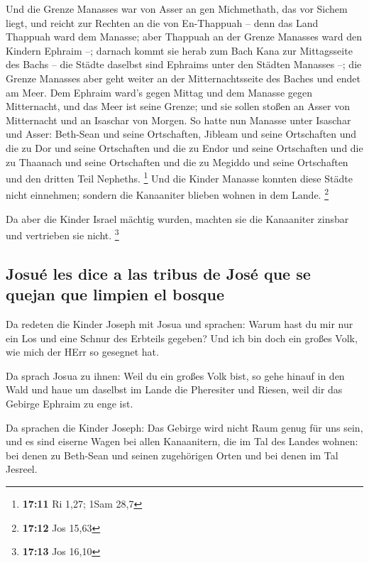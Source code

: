  Und die Grenze Manasses war von Asser an gen Michmethath,
das vor Sichem liegt, und reicht zur Rechten an die von En-Thappuah --
 denn das Land Thappuah ward dem Manasse; aber Thappuah an
der Grenze Manasses ward den Kindern Ephraim --;  darnach
kommt sie herab zum Bach Kana zur Mittagsseite des Bachs -- die Städte
daselbst sind Ephraims unter den Städten Manasses --; die Grenze
Manasses aber geht weiter an der Mitternachtsseite des Baches und endet
am Meer.  Dem Ephraim ward's gegen Mittag und dem Manasse
gegen Mitternacht, und das Meer ist seine Grenze; und sie sollen stoßen
an Asser von Mitternacht und an Isaschar von Morgen.  So
hatte nun Manasse unter Isaschar und Asser: Beth-Sean und seine
Ortschaften, Jibleam und seine Ortschaften und die zu Dor und seine
Ortschaften und die zu Endor und seine Ortschaften und die zu Thaanach
und seine Ortschaften und die zu Megiddo und seine Ortschaften und den
dritten Teil Nepheths. \footnote{\textbf{17:11} Ri 1,27; 1Sam 28,7}
 Und die Kinder Manasse konnten diese Städte nicht
einnehmen; sondern die Kanaaniter blieben wohnen in dem Lande.
\footnote{\textbf{17:12} Jos 15,63}

 Da aber die Kinder Israel mächtig wurden, machten sie
die Kanaaniter zinsbar und vertrieben sie nicht. \footnote{\textbf{17:13}
  Jos 16,10}

\hypertarget{josuuxe9-les-dice-a-las-tribus-de-josuxe9-que-se-quejan-que-limpien-el-bosque}{%
\subsection{Josué les dice a las tribus de José que se quejan que
limpien el
bosque}\label{josuuxe9-les-dice-a-las-tribus-de-josuxe9-que-se-quejan-que-limpien-el-bosque}}

 Da redeten die Kinder Joseph mit Josua und sprachen:
Warum hast du mir nur ein Los und eine Schnur des Erbteils gegeben? Und
ich bin doch ein großes Volk, wie mich der HErr so gesegnet hat.

 Da sprach Josua zu ihnen: Weil du ein großes Volk bist,
so gehe hinauf in den Wald und haue um daselbst im Lande die Pheresiter
und Riesen, weil dir das Gebirge Ephraim zu enge ist.

 Da sprachen die Kinder Joseph: Das Gebirge wird nicht
Raum genug für uns sein, und es sind eiserne Wagen bei allen
Kanaanitern, die im Tal des Landes wohnen: bei denen zu Beth-Sean und
seinen zugehörigen Orten und bei denen im Tal Jesreel.

